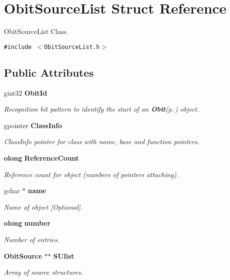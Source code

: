 \section{Obit\-Source\-List Struct Reference}
\label{structObitSourceList}
Obit\-Source\-List Class.  


{\tt \#include $<$Obit\-Source\-List.h$>$}

\subsection*{Public Attributes}
\begin{CompactItemize}
\item 
gint32 {\bf Obit\-Id}
\begin{CompactList}\small\item\em Recognition bit pattern to identify the start of an {\bf Obit}{\rm (p.\,\pageref{structObit})} object. \item\end{CompactList}\item 
gpointer {\bf Class\-Info}
\begin{CompactList}\small\item\em Class\-Info pointer for class with name, base and function pointers. \item\end{CompactList}\item 
{\bf olong} {\bf Reference\-Count}
\begin{CompactList}\small\item\em Reference count for object (numbers of pointers attaching). \item\end{CompactList}\item 
gchar $\ast$ {\bf name}
\begin{CompactList}\small\item\em Name of object [Optional]. \item\end{CompactList}\item 
{\bf olong} {\bf number}
\begin{CompactList}\small\item\em Number of entries. \item\end{CompactList}\item 
{\bf Obit\-Source} $\ast$$\ast$ {\bf SUlist}
\begin{CompactList}\small\item\em Array of source structures. \item\end{CompactList}\end{CompactItemize}



